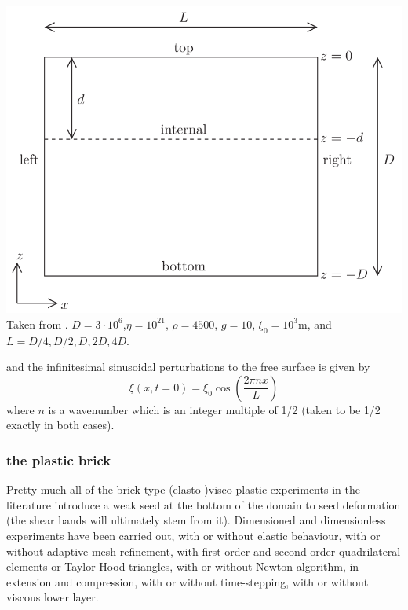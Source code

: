 \begin{center}
\begin{minipage}{0.45\textwidth}
\includegraphics[height=0.8\textwidth]{images/benchmark_relaxation/krwd12}\\
{\captionfont Taken from \cite{krwd12}. $D=3\cdot 10^6$,$\eta=10^{21}$, $\rho=4500$, $g=10$, $\xi_0=10^3$m, and 
$L=D/4,D/2,D,2D,4D$.}
\end{minipage}
\end{center}
and the infinitesimal sinusoidal perturbations to the free surface is given by
\[
\xi(x,t=0)=\xi_0 \cos \left( \frac{2 \pi n x}{L}  \right)
\]
where $n$ is a wavenumber which is an integer multiple of 1/2 (taken to be 1/2 exactly in both cases).


\subsubsection{the plastic brick}

\Literature \cite{hans03,moml07,lemm08,kaus10,egat10,qurj09,mishin11,maie12,spmw16,gltf18,frbt19,aspectmanual}

Pretty much all of the brick-type (elasto-)visco-plastic experiments in the literature
introduce a weak seed at the bottom of the domain to seed deformation (the shear bands
will ultimately stem from it). 
Dimensioned and dimensionless experiments have been carried out, with or without 
elastic behaviour, with or without adaptive mesh refinement, with first order and 
second order quadrilateral elements or Taylor-Hood triangles, with or without 
Newton algorithm, in extension and compression, with or without time-stepping,
with or without viscous lower layer. 


